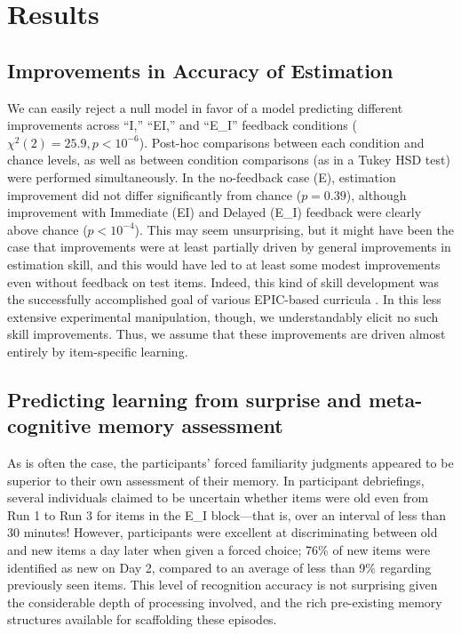 \section{Results}

\subsection{Improvements in Accuracy of Estimation}

We can easily reject a null model in favor of a model predicting different
improvements across ``I,'' ``EI,'' and ``E\_I'' feedback conditions ($\chi^2(2)
= 25.9, p < 10^{-6}$). Post-hoc comparisons between each condition and chance
levels, as well as between condition comparisons (as in a Tukey HSD test) were
performed simultaneously. In the no-feedback case (E), estimation improvement
did not differ significantly from chance ($p = 0.39$), although improvement with
Immediate (EI) and Delayed (E\_I) feedback were clearly above chance ($p <
10^{-4}$). This may seem unsurprising, but it might have been the case that
improvements were at least partially driven by general improvements in
estimation skill, and this would have led to at least some modest improvements
even without feedback on test items. Indeed, this kind of skill development was
the successfully accomplished goal of various EPIC-based curricula
\cite[e.g.,][]{munnich_numerically-driven_2004,ranney_designing_2008}. In this
less extensive experimental manipulation, though, we understandably elicit no
such skill improvements. Thus, we assume that these improvements are driven
almost entirely by item-specific learning.

\subsection{Predicting learning from surprise and meta-cognitive memory
assessment}

As is often the case, the participants' forced familiarity judgments appeared to
be superior to their own assessment of their memory.  In participant
debriefings, several individuals claimed to be uncertain whether items were old
even from Run 1 to Run 3 for items in the E\_I block––that is, over an interval
of less than 30 minutes!  However, participants were excellent at discriminating
between old and new items a day later when given a forced choice; 76\% of new
items were identified as new on Day 2, compared to an average of less than 9\%
regarding previously seen items. This level of recognition accuracy is not
surprising given the considerable depth of processing involved, and the rich
pre-existing memory structures available for scaffolding these episodes.

